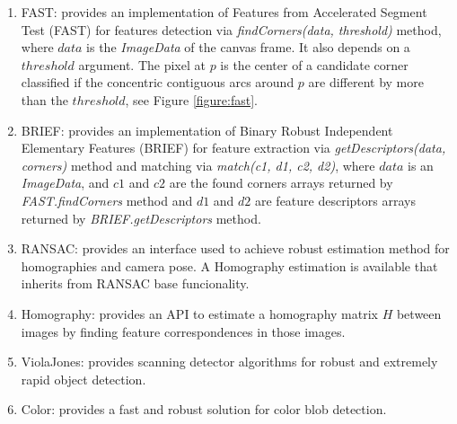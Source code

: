 \begin{enumerate}
  \item FAST: provides an implementation of Features from Accelerated Segment Test (FAST) \cite{Rosten2010} for features detection via \textit{findCorners(data, threshold)} method, where $data$ is the \textit{ImageData} of the canvas frame. It also depends on a $threshold$ argument. The pixel at $p$ is the center of a candidate corner classified if the concentric contiguous arcs around $p$ are different by more than the $threshold$, see Figure \ref{figure:fast}.

  \item BRIEF: provides an implementation of Binary Robust Independent Elementary Features (BRIEF) \cite{Calonder2010} for feature extraction via \textit{getDescriptors(data, corners)} method and matching via \textit{match(c1, d1, c2, d2)}, where $data$ is an \textit{ImageData}, and $c1$ and $c2$ are the found corners arrays returned by \textit{FAST.findCorners} method and $d1$ and $d2$ are feature descriptors arrays returned by \textit{BRIEF.getDescriptors} method.
  \item RANSAC: provides an interface used to achieve robust estimation method for homographies and camera pose. A Homography estimation is available that inherits from RANSAC \cite{Hartley2004} base funcionality.
  \item Homography: provides an API to estimate a homography matrix $H$ between images by finding feature correspondences in those images.
  \item ViolaJones: provides scanning detector algorithms for robust and extremely rapid object detection.
  \item Color: provides a fast and robust solution for color blob detection.
\end{enumerate}

